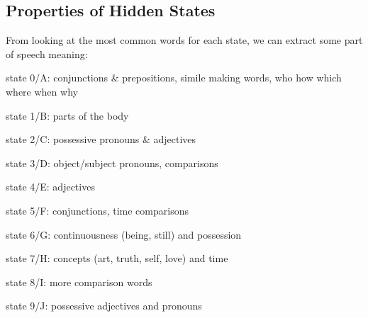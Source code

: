

\subsection{Properties of Hidden States}
From looking at the most common words for each state, we can extract some part of speech meaning:

\begin{compactitem}
\item state 0/A: conjunctions \& prepositions, simile making words, who how which where when why
\item state 1/B: parts of the body
\item state 2/C: possessive pronouns \& adjectives
\item state 3/D: object/subject pronouns, comparisons
\item state 4/E: adjectives
\item state 5/F: conjunctions, time comparisons
\item state 6/G: continuousness (being, still) and possession
\item state 7/H: concepts (art, truth, self, love) and time
\item state 8/I: more comparison words
\item state 9/J: possessive adjectives and pronouns
\end{compactitem}

